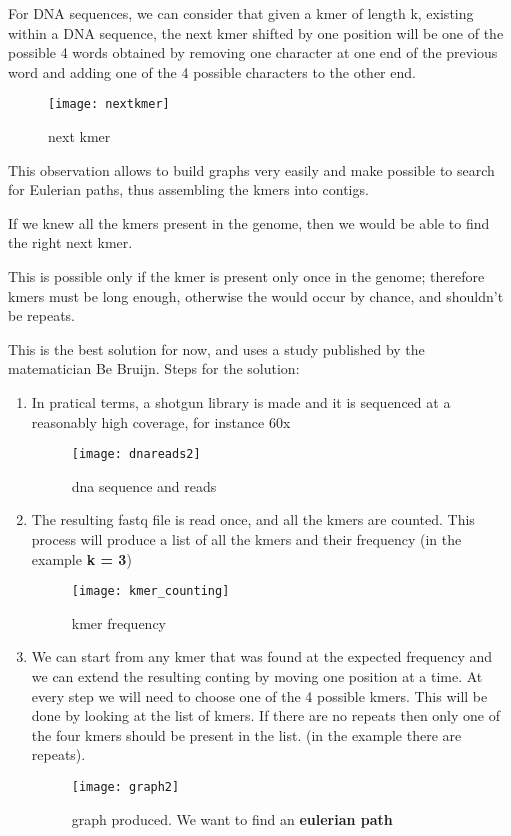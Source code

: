 For DNA sequences, we can consider that given a kmer of length k,
existing within a DNA sequence, the next kmer shifted by one position will be
one of the possible 4 words obtained by removing one character at one end of
the previous word and adding one of the 4 possible characters to the other end.

\begin{figure}[H]
  \centering
  \texttt{[image: nextkmer]}
  \caption{next kmer}
  \label{fig:nextkmer}
\end{figure}

This observation allows to build graphs very easily and make possible to search
for Eulerian paths, thus assembling the kmers into contigs.

If we knew all the kmers present in the genome, then we would be able to find
the right next kmer.

This is possible only if the kmer is present only once in the genome;
therefore kmers must be long enough, otherwise the would occur by chance,
and shouldn’t be repeats.

This is the best solution for now, and uses a study published by the
matematician Be Bruijn.
Steps for the solution:
\begin{enumerate}
  \item In pratical terms, a shotgun library is made and it is sequenced at a
reasonably high coverage, for instance 60x

\begin{figure}[H]
  \centering
  \texttt{[image: dnareads2]}
  \caption{dna sequence and reads}
  \label{fig:dnareads}
\end{figure}

  \item The resulting fastq file is read once, and all the kmers are counted.
This process will produce a list of all the kmers and their frequency
(in the example \textbf{k = 3})

\begin{figure}[H]
  \centering
  \texttt{[image: kmer\_counting]}
  \caption{kmer frequency}
  \label{fig:kmer_counting}
\end{figure}

  \item We can start from any kmer that was found at the expected frequency and
we can extend the resulting conting by moving one position at a time. At every
step we will need to choose one of the 4 possible kmers. This will be done by
looking at the list of kmers. If there are no repeats then only one of the four
kmers should be present in the list.
(in the example there are repeats).

\begin{figure}[H]
  \centering
  \texttt{[image: graph2]}
  \caption{graph produced. We want to find an \textbf{eulerian path}}
  \label{fig:graph2}
\end{figure}

\end{enumerate}

